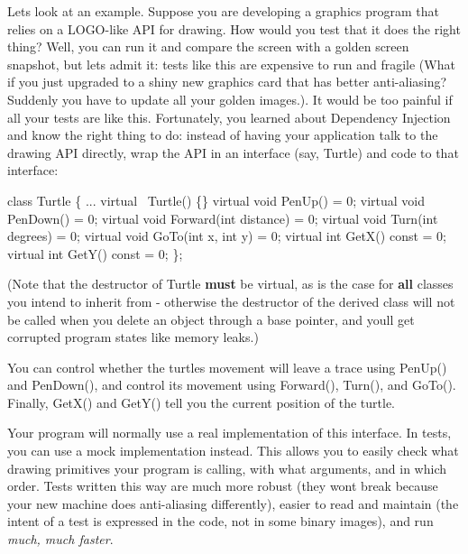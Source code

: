 Let\textquotesingle{}s look at an example. Suppose you are developing a graphics program that relies on a L\+O\+G\+O-\/like A\+PI for drawing. How would you test that it does the right thing? Well, you can run it and compare the screen with a golden screen snapshot, but let\textquotesingle{}s admit it\+: tests like this are expensive to run and fragile (What if you just upgraded to a shiny new graphics card that has better anti-\/aliasing? Suddenly you have to update all your golden images.). It would be too painful if all your tests are like this. Fortunately, you learned about Dependency Injection and know the right thing to do\+: instead of having your application talk to the drawing A\+PI directly, wrap the A\+PI in an interface (say, {\ttfamily Turtle}) and code to that interface\+:


\begin{DoxyCode}
class Turtle \{
  ...
  virtual ~Turtle() \{\}
  virtual void PenUp() = 0;
  virtual void PenDown() = 0;
  virtual void Forward(int distance) = 0;
  virtual void Turn(int degrees) = 0;
  virtual void GoTo(int x, int y) = 0;
  virtual int GetX() const = 0;
  virtual int GetY() const = 0;
\};
\end{DoxyCode}


(Note that the destructor of {\ttfamily Turtle} {\bfseries must} be virtual, as is the case for {\bfseries all} classes you intend to inherit from -\/ otherwise the destructor of the derived class will not be called when you delete an object through a base pointer, and you\textquotesingle{}ll get corrupted program states like memory leaks.)

You can control whether the turtle\textquotesingle{}s movement will leave a trace using {\ttfamily Pen\+Up()} and {\ttfamily Pen\+Down()}, and control its movement using {\ttfamily Forward()}, {\ttfamily Turn()}, and {\ttfamily Go\+To()}. Finally, {\ttfamily Get\+X()} and {\ttfamily Get\+Y()} tell you the current position of the turtle.

Your program will normally use a real implementation of this interface. In tests, you can use a mock implementation instead. This allows you to easily check what drawing primitives your program is calling, with what arguments, and in which order. Tests written this way are much more robust (they won\textquotesingle{}t break because your new machine does anti-\/aliasing differently), easier to read and maintain (the intent of a test is expressed in the code, not in some binary images), and run {\itshape much, much faster}.

